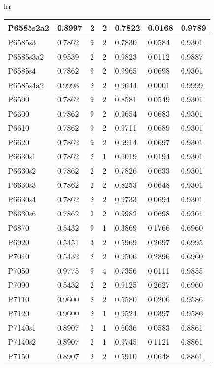 \begin{table}[H]
\begin{tabular}{lrr}
\begin{table}[!ht]
\begin{tabular}{|l|l|l|l|l|l|l|}
        P6585s2a2 & 0.8997 & 2 & 2 & 0.7822 & 0.0168 & 0.9789 \\ \hline
        P6585s3 & 0.7862 & 9 & 2 & 0.7830 & 0.0584 & 0.9301 \\ \hline
        P6585s3a2 & 0.9539 & 2 & 2 & 0.9823 & 0.0112 & 0.9887 \\ \hline
        P6585s4 & 0.7862 & 9 & 2 & 0.9965 & 0.0698 & 0.9301 \\ \hline
        P6585s4a2 & 0.9993 & 2 & 2 & 0.9644 & 0.0001 & 0.9999 \\ \hline
        P6590 & 0.7862 & 9 & 2 & 0.8581 & 0.0549 & 0.9301 \\ \hline
        P6600 & 0.7862 & 9 & 2 & 0.9654 & 0.0683 & 0.9301 \\ \hline
        P6610 & 0.7862 & 9 & 2 & 0.9711 & 0.0689 & 0.9301 \\ \hline
        P6620 & 0.7862 & 9 & 2 & 0.9914 & 0.0697 & 0.9301 \\ \hline
        P6630s1 & 0.7862 & 2 & 1 & 0.6019 & 0.0194 & 0.9301 \\ \hline
        P6630s2 & 0.7862 & 2 & 2 & 0.7826 & 0.0633 & 0.9301 \\ \hline
        P6630s3 & 0.7862 & 2 & 2 & 0.8253 & 0.0648 & 0.9301 \\ \hline
        P6630s4 & 0.7862 & 2 & 2 & 0.9733 & 0.0694 & 0.9301 \\ \hline
        P6630s6 & 0.7862 & 2 & 2 & 0.9982 & 0.0698 & 0.9301 \\ \hline
        P6870 & 0.5432 & 9 & 1 & 0.3869 & 0.1766 & 0.6960 \\ \hline
        P6920 & 0.5451 & 3 & 2 & 0.5969 & 0.2697 & 0.6995 \\ \hline
        P7040 & 0.5432 & 2 & 2 & 0.9506 & 0.2896 & 0.6960 \\ \hline
        P7050 & 0.9775 & 9 & 4 & 0.7356 & 0.0111 & 0.9855 \\ \hline
        P7090 & 0.5432 & 2 & 2 & 0.9125 & 0.2627 & 0.6960 \\ \hline
        P7110 & 0.9600 & 2 & 2 & 0.5580 & 0.0206 & 0.9586 \\ \hline
        P7120 & 0.9600 & 2 & 1 & 0.9524 & 0.0397 & 0.9586 \\ \hline
        P7140s1 & 0.8907 & 2 & 1 & 0.6036 & 0.0583 & 0.8861 \\ \hline
        P7140s2 & 0.8907 & 2 & 1 & 0.9745 & 0.1121 & 0.8861 \\ \hline
        P7150 & 0.8907 & 2 & 2 & 0.5910 & 0.0648 & 0.8861 \\ \hline

\end{tabular}
\end{table}
\end{tabular}
\end{table}
